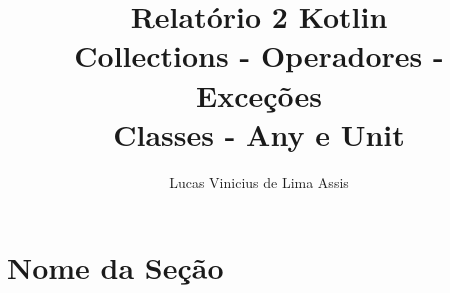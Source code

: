 \documentclass[a4paper]{article}
\title{Relatório 2 Kotlin\\ \small{Collections - Operadores - Exceções} \\ \small{Classes - Any e Unit}}
\author{Lucas Vinicius de Lima Assis}
\begin{document}
    \maketitle

    \section{Nome da Seção}
\end{document}
